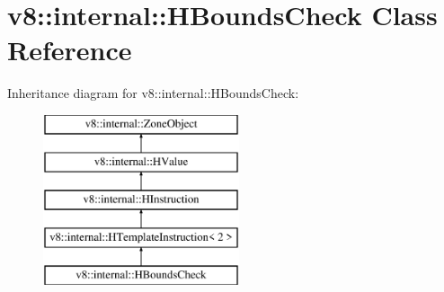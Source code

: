\hypertarget{classv8_1_1internal_1_1_h_bounds_check}{}\section{v8\+:\+:internal\+:\+:H\+Bounds\+Check Class Reference}
\label{classv8_1_1internal_1_1_h_bounds_check}
Inheritance diagram for v8\+:\+:internal\+:\+:H\+Bounds\+Check\+:\begin{figure}[H]
\begin{center}
\leavevmode
\includegraphics[height=5.000000cm]{classv8_1_1internal_1_1_h_bounds_check}
\end{center}
\end{figure}
